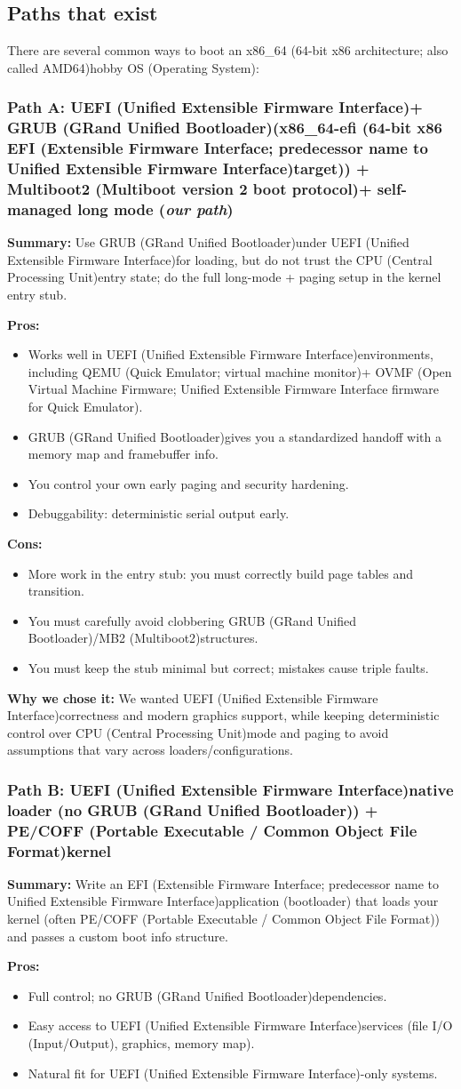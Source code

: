 \documentclass[11pt]{article}
\newcommand{\CPU}{CPU (Central Processing Unit)}
\newcommand{\EFI}{EFI (Extensible Firmware Interface; predecessor name to Unified Extensible Firmware Interface)}
\newcommand{\GRUB}{GRUB (GRand Unified Bootloader)}
\newcommand{\IO}{I/O (Input/Output)}
\newcommand{\MBtwo}{Multiboot2 (Multiboot version 2 boot protocol)}
\newcommand{\MBtwoShort}{MB2 (Multiboot2)}
\newcommand{\OS}{OS (Operating System)}
\newcommand{\OVMF}{OVMF (Open Virtual Machine Firmware; Unified Extensible Firmware Interface firmware for Quick Emulator)}
\newcommand{\QEMU}{QEMU (Quick Emulator; virtual machine monitor)}
\newcommand{\UEFI}{UEFI (Unified Extensible Firmware Interface)}
\newcommand{\xEightySixSixtyFour}{x86\_64 (64-bit x86 architecture; also called AMD64)}
\newcommand{\PECOFF}{PE/COFF (Portable Executable / Common Object File Format)}
\begin{document}
\subsection{Paths that exist}
There are several common ways to boot an \xEightySixSixtyFour hobby \OS:

\subsubsection{Path A: \UEFI + \GRUB (x86\_64-efi (64-bit x86 \EFI target)) + \MBtwo + self-managed long mode (\emph{our path})}
\textbf{Summary:} Use \GRUB under \UEFI for loading, but do not trust the \CPU entry state; do the full long-mode + paging setup in the kernel entry stub.

\textbf{Pros:}
\begin{itemize}
  \item Works well in \UEFI environments, including \QEMU + \OVMF.
  \item \GRUB gives you a standardized handoff with a memory map and framebuffer info.
  \item You control your own early paging and security hardening.
  \item Debuggability: deterministic serial output early.
\end{itemize}

\textbf{Cons:}
\begin{itemize}
  \item More work in the entry stub: you must correctly build page tables and transition.
  \item You must carefully avoid clobbering \GRUB/\MBtwoShort structures.
  \item You must keep the stub minimal but correct; mistakes cause triple faults.
\end{itemize}

\textbf{Why we chose it:}
We wanted \UEFI correctness and modern graphics support, while keeping deterministic control over \CPU mode and paging to avoid assumptions that vary across loaders/configurations.

\subsubsection{Path B: \UEFI native loader (no \GRUB) + \PECOFF kernel}
\textbf{Summary:} Write an \EFI application (bootloader) that loads your kernel (often \PECOFF) and passes a custom boot info structure.

\textbf{Pros:}
\begin{itemize}
  \item Full control; no \GRUB dependencies.
  \item Easy access to \UEFI services (file \IO, graphics, memory map).
  \item Natural fit for \UEFI-only systems.
\end{itemize}
\end{document}
